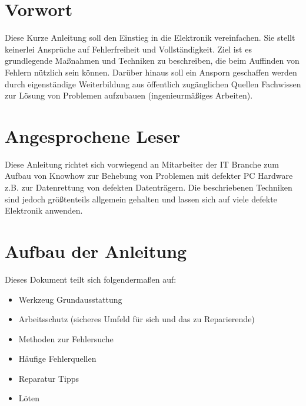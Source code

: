 \section{Vorwort}

Diese Kurze Anleitung soll den Einstieg in die Elektronik vereinfachen.
Sie stellt keinerlei Ansprüche auf Fehlerfreiheit und Vollständigkeit.
Ziel ist es grundlegende Maßnahmen und Techniken zu beschreiben, die beim Auffinden von Fehlern nützlich sein können.
Darüber hinaus soll ein Ansporn geschaffen werden durch eigenständige Weiterbildung aus öffentlich zugänglichen Quellen Fachwissen zur Lösung von Problemen aufzubauen (ingenieurmäßiges Arbeiten).


\section{Angesprochene Leser}

Diese Anleitung richtet sich vorwiegend an Mitarbeiter der IT Branche zum Aufbau von Knowhow zur Behebung von Problemen mit defekter PC Hardware z.B. zur Datenrettung von defekten Datenträgern.
Die beschriebenen Techniken sind jedoch größtenteils allgemein gehalten und lassen sich auf viele defekte Elektronik anwenden.

\section{Aufbau der Anleitung}

Dieses Dokument teilt sich folgendermaßen auf:
\begin{itemize}
	\item Werkzeug Grundausstattung
	\item Arbeitsschutz (sicheres Umfeld für sich und das zu Reparierende)
	\item Methoden zur Fehlersuche
	\item Häufige Fehlerquellen
	\item Reparatur Tipps
	\item Löten
\end{itemize}